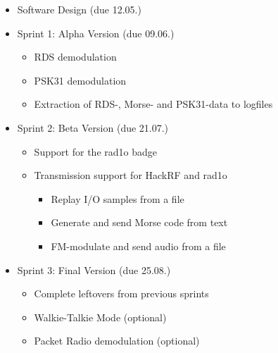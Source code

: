 \begin{itemize}
	\item Software Design (due 12.05.)
	\item Sprint 1: Alpha Version (due 09.06.)
	\begin{itemize}
		\item \ac{RDS} demodulation
		\item \ac{PSK31} demodulation
		\item Extraction of \ac{RDS}-, Morse- and \ac{PSK31}-data to logfiles
	\end{itemize}
	\item Sprint 2: Beta Version (due 21.07.)
	\begin{itemize}
		\item Support for the rad1o badge
		\item Transmission support for HackRF and rad1o
		\begin{itemize}
			\item Replay I/O samples from a file
			\item Generate and send Morse code from text
			\item FM-modulate and send audio from a file
		\end{itemize}
	\end{itemize}
	\item Sprint 3: Final Version (due 25.08.)
	\begin{itemize}
		\item Complete leftovers from previous sprints
		\item Walkie-Talkie Mode (optional)
		\item Packet Radio demodulation (optional)
	\end{itemize}
\end{itemize}